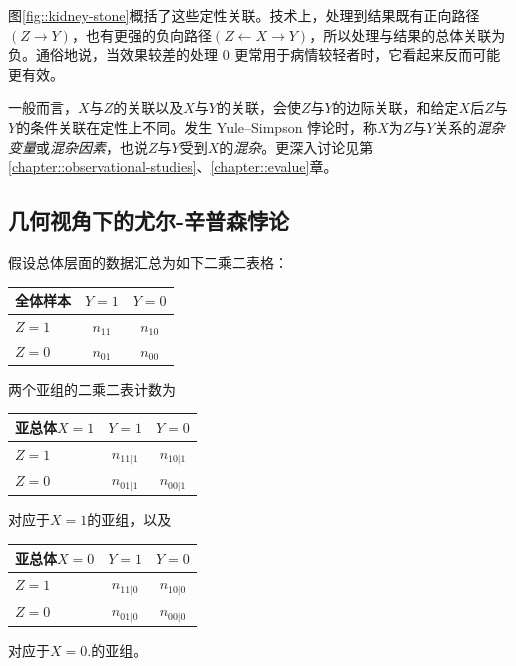 图\ref{fig::kidney-stone}概括了这些定性关联。技术上，处理到结果既有正向路径$(Z\rightarrow Y)$，也有更强的负向路径$(Z\leftarrow X \rightarrow Y)$，所以处理与结果的总体关联为负。通俗地说，当效果较差的处理 0 更常用于病情较轻者时，它看起来反而可能更有效。 




一般而言，$X$与$Z$的关联以及$X$与$Y$的关联，会使$Z$与$Y$的边际关联，和给定$X$后$Z$与$Y$的条件关联在定性上不同。发生 Yule--Simpson 悖论时，称$X$为$Z$与$Y$关系的{\it 混杂变量}或{\it 混杂因素}，也说$Z$与$Y$受到$X$的{\it 混杂}。更深入讨论见第\ref{chapter::observational-studies}、\ref{chapter::evalue}章。 
 




\subsection{几何视角下的尤尔-辛普森悖论}


假设总体层面的数据汇总为如下二乘二表格：


 \begin{center}
\begin{tabular}{lcc}
\hline 
 全体样本       & $Y =1$ & $Y =0$\\\hline
$Z =1$ & $n_{11}$ & $n_{10}$\\ 
$Z =0$ & $n_{01}$ & $n_{00}$\\
\hline 
\end{tabular}
\end{center}


两个亚组的二乘二表计数为
 \begin{center}
\begin{tabular}{lcc}
\hline 
亚总体$X=1$        & $Y =1$ & $Y =0$\\\hline
$Z=1$ & $n_{11|1}$ & $n_{10|1}$\\ 
$Z=0$ & $n_{01|1}$ & $n_{00|1}$\\
\hline 
\end{tabular}
\end{center}
对应于$X=1$的亚组，以及
 \begin{center}
\begin{tabular}{lcc}
\hline 
亚总体$X=0$    & $Y =1$ & $Y =0$\\\hline
$Z =1$ & $n_{11|0}$ & $n_{10|0}$\\ 
$Z =0$ & $n_{01|0}$ & $n_{00|0}$\\
\hline 
\end{tabular}
\end{center}
对应于$X=0.$的亚组。


